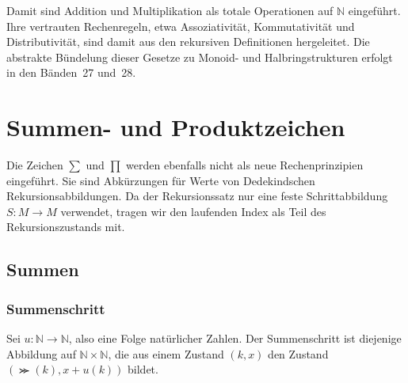 \documentclass[main.tex]{subfiles}
\begin{document}
\begin{tabproofsplitwide}
  \closeproofpartwide
\end{tabproofsplitwide}

Damit sind Addition und Multiplikation als totale Operationen auf
\(\mathbb{N}\) eingeführt. Ihre vertrauten Rechenregeln, etwa Assoziativität,
Kommutativität und Distributivität, sind damit aus den rekursiven Definitionen
hergeleitet. Die abstrakte Bündelung dieser Gesetze zu Monoid- und
Halbringstrukturen erfolgt in den Bänden~27 und~28.

\section{Summen- und Produktzeichen}

Die Zeichen \(\sum\) und \(\prod\) werden ebenfalls nicht als neue
Rechenprinzipien eingeführt. Sie sind Abkürzungen für Werte von
Dedekindschen Rekursionsabbildungen. Da der Rekursionssatz nur eine feste
Schrittabbildung \(S\colon M\to M\) verwendet, tragen wir den laufenden Index
als Teil des Rekursionszustands mit.

\subsection{Summen}

\subsubsection{Summenschritt}

Sei \(u\colon\mathbb{N}\to\mathbb{N}\), also eine Folge natürlicher Zahlen.
Der Summenschritt ist diejenige Abbildung auf
\(\mathbb{N}\times\mathbb{N}\), die aus einem Zustand \((k,x)\) den Zustand
\((\Succ(k),x + u(k))\) bildet.
\end{document}

